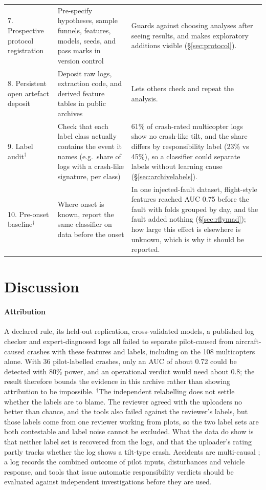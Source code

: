 \documentclass[preprint,12pt]{elsarticle}
\begin{document}
\begin{table}[!htbp]
\begin{tabularx}{\textwidth}{@{}p{} p{} X@{}}
7. Prospective protocol registration & Pre-specify hypotheses, sample funnels, features, models, seeds, and pass marks in version control & Guards against choosing analyses after seeing results, and makes exploratory additions visible (§\ref{sec:protocol}). \\
8. Persistent open artefact deposit & Deposit raw logs, extraction code, and derived feature tables in public archives & Lets others check and repeat the analysis. \\
9. Label audit$^\dagger$ & Check that each label class actually contains the event it names (e.g.\ share of logs with a crash-like signature, per class) & 61\% of crash-rated multicopter logs show no crash-like tilt, and the share differs by responsibility label (23\% vs 45\%), so a classifier could separate labels without learning cause (§\ref{sec:archivelabels}). \\
10. Pre-onset baseline$^\dagger$ & Where onset is known, report the same classifier on data before the onset & In one injected-fault dataset, flight-style features reached AUC 0.75 before the fault with folds grouped by day, and the fault added nothing (§\ref{sec:rflymad}); how large this effect is elsewhere is unknown, which is why it should be reported. \\
\bottomrule
\end{tabularx}
\end{table}

\section{Discussion}
\label{sec:discussion}

\paragraph{Attribution} A declared rule, its held-out replication, cross-validated models, a published log checker and expert-diagnosed logs all failed to separate pilot-caused from aircraft-caused crashes with these features and labels, including on the 108 multicopters alone. With 36 pilot-labelled crashes, only an AUC of about 0.72 could be detected with 80\% power, and an operational verdict would need about 0.8; the result therefore bounds the evidence in this archive rather than showing attribution to be impossible. $^\dagger$The independent relabelling does not settle whether the labels are to blame. The reviewer agreed with the uploaders no better than chance, and the tools also failed against the reviewer's labels, but those labels come from one reviewer working from plots, so the two label sets are both contestable and label noise cannot be excluded. What the data do show is that neither label set is recovered from the logs, and that the uploader's rating partly tracks whether the log shows a tilt-type crash. Accidents are multi-causal \cite{wiegmann2003hfacs}; a log records the combined outcome of pilot inputs, disturbances and vehicle response, and tools that issue automatic responsibility verdicts should be evaluated against independent investigations before they are used.
\end{document}
